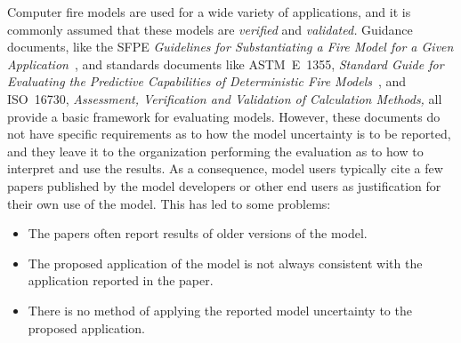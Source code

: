 \documentclass[fleqn,b5paper]{article}
\begin{document}
Computer fire models are used for a wide variety of applications, and it is commonly assumed that these models are {\em verified} and {\em validated.} Guidance documents, like the SFPE {\em Guidelines for Substantiating a Fire Model for a Given Application}~\cite{SFPE_G.06}, and standards documents like ASTM~E~1355, {\em Standard Guide for Evaluating the Predictive Capabilities of Deterministic Fire Models}~\cite{ASTM:E1355}, and ISO~16730, {\em Assessment, Verification and Validation of Calculation Methods,} all provide a basic framework for evaluating models. However, these documents do not have specific requirements as to how the model uncertainty is to be reported, and they leave it to the organization performing the evaluation as to how to interpret and use the results. As a consequence, model users typically cite a few papers published by the model developers or other end users as justification for their own use of the model. This has led to some problems:
\begin{itemize}
\item The papers often report results of older versions of the model.
\item The proposed application of the model is not always consistent with the application reported in the paper.
\item There is no method of applying the reported model uncertainty to the proposed application.
\end{itemize}
\end{document}
